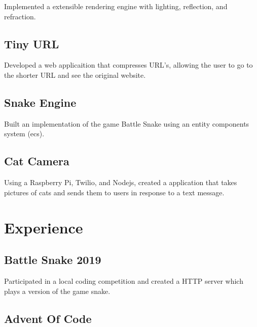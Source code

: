\documentclass{article}
\newcommand{\hrefColored}[3]{\href{#2}{\color{#1}{#3}}}
\begin{document}
Implemented a extensible rendering engine with lighting, reflection, and 
refraction.

\subsection{Tiny URL \hrefColored{blue}{https://github.com/McRaeAlex/tinyURL}{github.com/McRaeAlex/tinyURL}}

Developed a web applicaition that compresses URL's, allowing the user to go to 
the shorter URL and see the original website.

\subsection{Snake Engine \hrefColored{blue}{https://github.com/McRaeAlex/dimensional-snake-engine}{github.com/McRaeAlex/dimensional-snake-engine}}

Built an implementation of the game Battle Snake using an entity components
system (ecs).

\subsection{Cat Camera \hrefColored{blue}{https://github.com/McRaeAlex/prettykitty}{github.com/McRaeAlex/prettykitty}}

Using a Raspberry Pi, Twilio, and Nodejs, created a application that takes 
pictures of cats and sends them to users in response to a text message.

\section{Experience}

\subsection{Battle Snake 2019 \hrefColored{blue}{https://github.com/McRaeAlex/BattleSnake2019}{github.com/McRaeAlex/BattleSnake2019}}

Participated in a local coding competition and created a HTTP server which plays
a version of the game snake.

\subsection{Advent Of Code \hrefColored{blue}{https://github.com/McRaeAlex/AdventOfCode2018}{github.com/McRaeAlex/AdventOfCode2018}}
\end{document}
